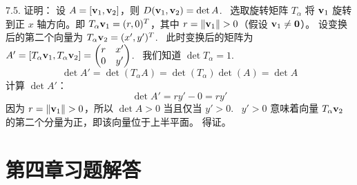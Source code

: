 \begin{exer}
7.5. 证明：
设 $A = [\mathbf{v}_1, \mathbf{v}_2]$，则 $D(\mathbf{v}_1, \mathbf{v}_2) = \det A$.~
选取旋转矩阵 $T_\alpha$ 将 $\mathbf{v}_1$ 旋转到正 $x$ 轴方向。即 $T_\alpha \mathbf{v}_1 = (r, 0)^T$，其中 $r = \|\mathbf{v}_1\| > 0$（假设 $\mathbf{v}_1 \neq \mathbf{0}$）。
设变换后的第二个向量为 $T_\alpha \mathbf{v}_2 = (x', y')^T$.~
此时变换后的矩阵为 $A' = [T_\alpha \mathbf{v}_1, T_\alpha \mathbf{v}_2] = \begin{pmatrix} r & x' \\ 0 & y' \end{pmatrix}$.~
我们知道 $\det T_\alpha = 1$.~
$$ \det A' = \det(T_\alpha A) = \det(T_\alpha) \det(A) = \det A $$
计算 $\det A'$：
$$ \det A' = r y' - 0 = r y' $$
因为 $r = \|\mathbf{v}_1\| > 0$，所以 $\det A > 0$ 当且仅当 $y' > 0$.~
$y' > 0$ 意味着向量 $T_\alpha \mathbf{v}_2$ 的第二个分量为正，即该向量位于上半平面。
得证。


\vspace{5ex}

\end{exer}








\section*{第四章习题解答}

